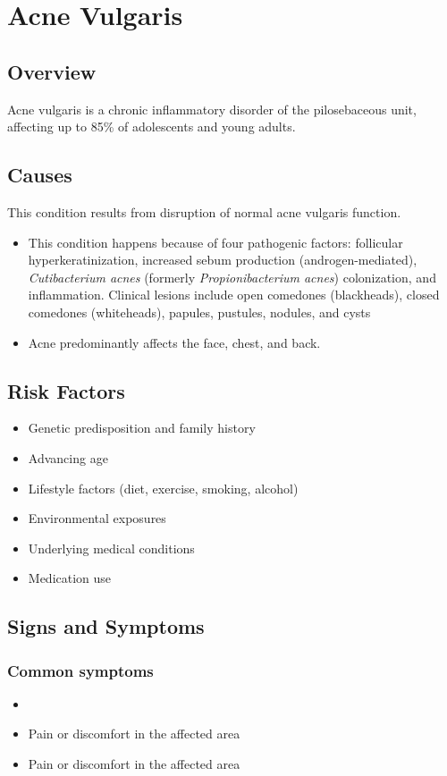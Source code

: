 \chapter{Acne Vulgaris}
\label{sec:Acne Vulgaris}

\section{Overview}
Acne vulgaris is a chronic inflammatory disorder of the pilosebaceous unit, affecting up to 85\% of adolescents and young adults.
\section{Causes}
This condition results from disruption of normal acne vulgaris function.

\begin{itemize}[noitemsep]
  \item This condition happens because of four pathogenic factors: follicular hyperkeratinization, increased sebum production (androgen-mediated), \textit{Cutibacterium acnes} (formerly \textit{Propionibacterium acnes}) colonization, and inflammation. Clinical lesions include open comedones (blackheads), closed comedones (whiteheads), papules, pustules, nodules, and cysts
  \item Acne predominantly affects the face, chest, and back.
\end{itemize}
\section{Risk Factors}


\begin{itemize}[noitemsep]
  \item Genetic predisposition and family history
  \item Advancing age
  \item Lifestyle factors (diet, exercise, smoking, alcohol)
  \item Environmental exposures
  \item Underlying medical conditions
  \item Medication use
\end{itemize}
\section{Signs and Symptoms}

\subsection{Common symptoms}
\begin{itemize}[noitemsep]
  \item \item Pain or discomfort in the affected area    \item Pain or discomfort in the affected area
  \end{itemize}

